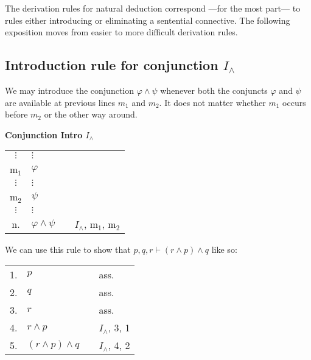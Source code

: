 \documentclass[nobib,nofonts]{tufte-handout}
\begin{document}
The derivation rules for natural deduction correspond ---for the most part--- to rules either introducing or eliminating a sentential connective.
The following exposition moves from easier to more difficult derivation rules.

\subsection{Introduction rule for conjunction $I_{\wedge}$}

We may introduce the conjunction $\varphi \wedge \psi$ whenever both the conjuncts $\varphi$ and $\psi$ are available at previous lines $m_{1}$ and $m_{2}$. It does not matter whether $m_{1}$ occurs before $m_{2}$ or the other way around.

\bigskip
\noindent \colorbox{mygray!60}{\centering
  \begin{minipage}[t]{0.35\linewidth}
    \textbf{Conjunction Intro $I_{\wedge}$}
  \end{minipage}
  \begin{minipage}[t]{0.55\linewidth}
    \begin{tabular}{clcl}
      $\vdots$ & $\vdots$              & \\
      m$_{1}$  & $\varphi$             &  \\
      $\vdots$ & $\vdots$              & \\
      m$_{2}$  & $\psi$                & \\
      $\vdots$ & $\vdots$              & \\
      n.       & $\varphi \wedge \psi$ & & $I_{\wedge}$, m$_{1}$, m$_{2}$
    \end{tabular}
  \end{minipage}
}
\bigskip

We can use this rule to show that $p, q, r \vdash (r \wedge p) \wedge q$ like so:

\begin{tabular}{clcl}
  1. & $p$ & & ass. \\
  2. & $q$ & & ass. \\
  3. & $r$ & & ass. \\
  4. & $r \wedge p$ & & $I_{\wedge}$, 3, 1  \\
  5. & $(r \wedge p) \wedge q$ & & $I_{\wedge}$, 4, 2  \\
\end{tabular}
\end{document}
